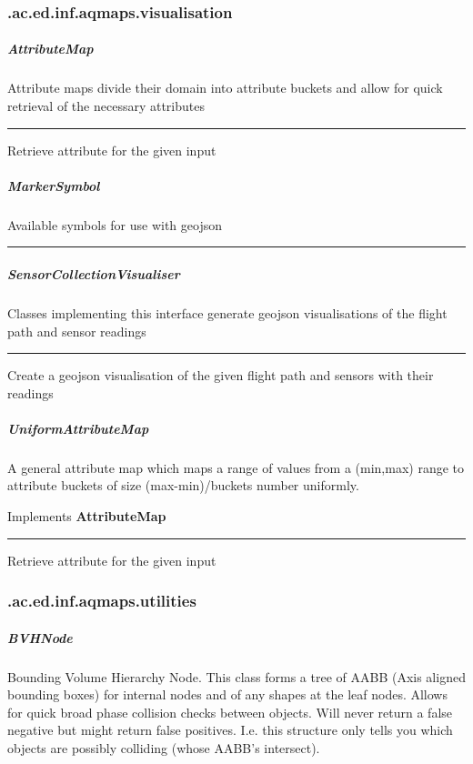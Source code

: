 \subsubsection{ .ac.ed.inf.aqmaps.visualisation }
\subparagraph{ AttributeMap } Attribute maps divide their domain into attribute buckets and allow for quick retrieval of the necessary attributes
 
\hrule
\begin{mitem}
\scriptsize
	{Retrieve attribute for the given input}
\end{mitem}

\subparagraph{ MarkerSymbol } Available symbols for use with geojson
 
\hrule

\subparagraph{ SensorCollectionVisualiser } Classes implementing this interface generate geojson visualisations of the flight path and sensor readings
 
\hrule
\begin{mitem}
\scriptsize
	{Create a geojson visualisation of the given flight path and sensors with their readings}
\end{mitem}

\subparagraph{ UniformAttributeMap } A general attribute map which maps a range of values from a (min,max) range to attribute buckets of size (max-min)/buckets number uniformly.
 
Implements \textbf{ AttributeMap }
\hrule
\begin{mitem}
\scriptsize
	{}
	{Retrieve attribute for the given input}
\end{mitem}

\subsubsection{ .ac.ed.inf.aqmaps.utilities }
\subparagraph{ BVHNode } Bounding Volume Hierarchy Node. This class forms a tree of AABB (Axis aligned bounding boxes) for internal nodes
 and of any shapes at the leaf nodes. Allows for quick broad phase collision checks between objects. Will never return a false negative but might return
 false positives. I.e. this structure only tells you which objects are possibly colliding (whose AABB's intersect).
 

